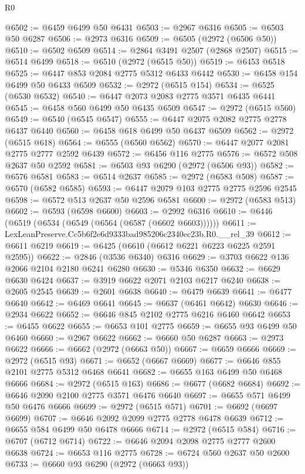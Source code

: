\begin{lexlean}{R0}
\begin{coremodule}
@6502 := @6459 @6499 @50 @6431
@6503 := @2967 @6316
@6505 := @6503 @50 @6287
@6506 := @2973 @6316
@6509 := @6505 (@2972 (@6506 @50))
@6510 := @6502 @6509
@6514 := @2864 @3491 @2507 (@2868 @2507)
@6515 := @6514 @6499
@6518 := @6510 (@2972 (@6515 @50))
@6519 := @6453 @6518
@6525 := @6447 @853 @2084 @2775 @5312 @6433 @6442
@6530 := @6458 @154 @6499 @50 @6433 @6509
@6532 := @2972 (@6515 @154)
@6534 := @6525 (@6530 @6532)
@6540 := @6447 @2073 @2083 @2775 @3571 @6435 @6441
@6545 := @6458 @560 @6499 @50 @6435 @6509
@6547 := @2972 (@6515 @560)
@6549 := @6540 (@6545 @6547)
@6555 := @6447 @2075 @2082 @2775 @2778 @6437 @6440
@6560 := @6458 @618 @6499 @50 @6437 @6509
@6562 := @2972 (@6515 @618)
@6564 := @6555 (@6560 @6562)
@6570 := @6447 @2077 @2081 @2775 @2777 @2592 @6439
@6572 := @6456 @116 @2775
@6576 := @6572 @508 @2637 @50 @2592
@6581 := @6503 @93 @6290 (@2972 (@6506 @93))
@6582 := @6576 @6581
@6583 := @6514 @2637
@6585 := @2972 (@6583 @508)
@6587 := @6570 (@6582 @6585)
@6593 := @6447 @2079 @103 @2775 @2775 @2596 @2545
@6598 := @6572 @513 @2637 @50 @2596 @6581
@6600 := @2972 (@6583 @513)
@6602 := @6593 (@6598 @6600)
@6603 := @2992 @6316
@6610 := @6446 (@6519 (@6534 (@6549 (@6564 (@6587 (@6602 @6603))))))
@6611 := LexLeanPreserve.Cc5b6f2e6d9333bad985206c2340ec23b.R0.__rel_39
@6612 := @6611 @6219
@6619 := @6425 (@6610 (@6612 @6221 @6223 @6225 @2591 @2595))
@6622 := @2846 (@3536 @6340) @6316
@6629 := @3703 @6622 @136 @2066 @2104 @2180 @6241 @6280
@6630 := @5346 @6350
@6632 := @6629 @6630 @6424
@6637 := @3919 @6622 @2071 @2103 @6217 @6240
@6638 := @2605 @2545
@6639 := @2601 @6638
@6640 := @6479 @6639
@6641 := @6477 @6640
@6642 := @6469 @6641
@6645 := @6637 (@6461 @6642) @6630
@6646 := @2934 @6622
@6652 := @6646 @845 @2102 @2775 @6216 @6460 @6642
@6653 := @6455 @6622
@6655 := @6653 @101 @2775
@6659 := @6655 @93 @6499 @50 @6460
@6660 := @2967 @6622
@6662 := @6660 @50 @6287
@6663 := @2973 @6622
@6666 := @6662 (@2972 (@6663 @50))
@6667 := @6659 @6666
@6669 := @2972 (@6515 @93)
@6671 := @6652 (@6667 @6669)
@6677 := @6646 @855 @2101 @2775 @5312 @6468 @6641
@6682 := @6655 @163 @6499 @50 @6468 @6666
@6684 := @2972 (@6515 @163)
@6686 := @6677 (@6682 @6684)
@6692 := @6646 @2090 @2100 @2775 @3571 @6476 @6640
@6697 := @6655 @571 @6499 @50 @6476 @6666
@6699 := @2972 (@6515 @571)
@6701 := @6692 (@6697 @6699)
@6707 := @6646 @2092 @2099 @2775 @2778 @6478 @6639
@6712 := @6655 @584 @6499 @50 @6478 @6666
@6714 := @2972 (@6515 @584)
@6716 := @6707 (@6712 @6714)
@6722 := @6646 @2094 @2098 @2775 @2777 @2600 @6638
@6724 := @6653 @116 @2775
@6728 := @6724 @560 @2637 @50 @2600
@6733 := @6660 @93 @6290 (@2972 (@6663 @93))

\end{coremodule}
\end{lexlean}
